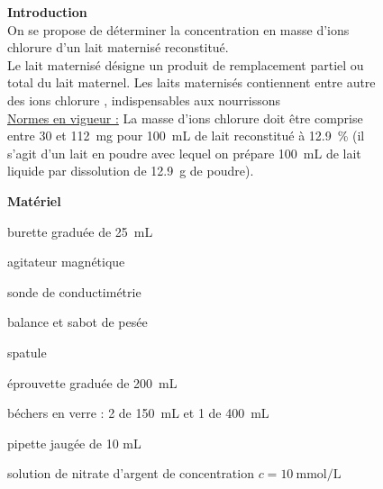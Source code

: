 \documentclass[a4paper,11pt,fleqn]{article}%
\begin{document}
\maketitle
\begin{figure}[h!]
	\begin{minipage}{.48\linewidth}
		\textbf{Introduction}\\
		On se propose de déterminer la concentration en masse d’ions chlorure d’un lait maternisé reconstitué.\\
		Le lait maternisé désigne un produit de remplacement partiel ou total du lait maternel. Les laits maternisés contiennent entre autre des ions chlorure , indispensables aux nourrissons\\
		\underline{Normes en vigueur :}
La masse d’ions chlorure doit être comprise entre \num{30} et \SI{112}{mg} pour \SI{100}{mL} de lait reconstitué à \SI{12,9}{\percent} (il s’agit d’un lait en poudre avec lequel on prépare \SI{100}{mL} de lait liquide par dissolution de \SI{12,9}{g} de poudre).
	\end{minipage}\hspace{.02\linewidth}
	\begin{minipage}{.48\linewidth}
		\textbf{Matériel}\\
		\begin{itemize*}
			\item burette graduée de \SI{25}{mL}
			\item agitateur magnétique 
			\item sonde de conductimétrie
			\item balance et sabot de pesée
			\item spatule
			\item éprouvette graduée de \SI{200}{mL}
			\item béchers en verre : \num{2} de \SI{150}{mL} et \num{1} de \SI{400}{mL}
			\item pipette jaugée de 10 mL
			 \item solution de nitrate d’argent de concentration 
		   $c = \SI{10}{\milli\mole\per\liter}$
		\end{itemize*}
	\end{minipage}
\end{figure}
\end{document}
